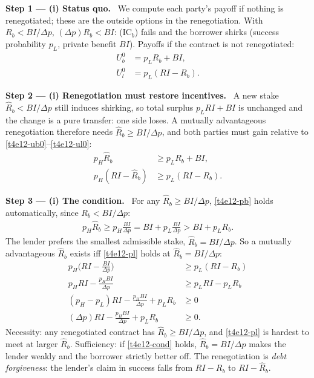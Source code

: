 \documentclass[11pt,a4paper]{article}
\newcommand{\step}[2]{\par\medskip\noindent\textbf{Step #1 --- #2.}~}
\begin{document}
\step{1}{(i) Status quo} We compute each party's payoff if nothing is renegotiated; these are the
outside options in the renegotiation. With $R_b<BI/\Delta p$, $(\Delta p)R_b<BI$: (IC$_b$) fails and
the borrower shirks (success probability $p_L$, private benefit $BI$). Payoffs if the contract is not
renegotiated:
\begin{align}
  U_b^0 &= p_LR_b+BI, \label{t4e12-ub0}\\
  U_l^0 &= p_L(RI-R_b). \label{t4e12-ul0}
\end{align}

\step{2}{(i) Renegotiation must restore incentives} A new stake $\hat R_b<BI/\Delta p$ still induces
shirking, so total surplus $p_LRI+BI$ is unchanged and the change is a pure transfer: one side loses.
A mutually advantageous renegotiation therefore needs $\hat R_b\ge BI/\Delta p$, and both parties must
gain relative to \eqref{t4e12-ub0}--\eqref{t4e12-ul0}:
\begin{align}
  p_H\hat R_b &\ge p_LR_b+BI, \label{t4e12-pb}\\
  p_H(RI-\hat R_b) &\ge p_L(RI-R_b). \label{t4e12-pl}
\end{align}

\step{3}{(i) The condition} For any $\hat R_b\ge BI/\Delta p$, \eqref{t4e12-pb} holds automatically, since
$R_b<BI/\Delta p$:
\begin{align}
  p_H\hat R_b \ge p_H\frac{BI}{\Delta p}=BI+p_L\frac{BI}{\Delta p} > BI+p_LR_b. \nonumber
\end{align}
The lender prefers the smallest admissible stake, $\hat R_b=BI/\Delta p$. So a mutually advantageous
$\hat R_b$ exists iff \eqref{t4e12-pl} holds at $\hat R_b=BI/\Delta p$:
\begin{align}
  p_H\Big(RI-\frac{BI}{\Delta p}\Big) &\ge p_L(RI-R_b) \nonumber\\
  p_HRI-\frac{p_HBI}{\Delta p} &\ge p_LRI-p_LR_b \nonumber\\
  (p_H-p_L)RI-\frac{p_HBI}{\Delta p}+p_LR_b &\ge 0 \nonumber\\
  (\Delta p)RI-\frac{p_HBI}{\Delta p}+p_LR_b &\ge 0. \label{t4e12-cond}
\end{align}
Necessity: any renegotiated contract has $\hat R_b\ge BI/\Delta p$, and \eqref{t4e12-pl} is hardest to
meet at larger $\hat R_b$. Sufficiency: if \eqref{t4e12-cond} holds, $\hat R_b=BI/\Delta p$ makes the
lender weakly and the borrower strictly better off. The renegotiation is \emph{debt forgiveness}: the
lender's claim in success falls from $RI-R_b$ to $RI-\hat R_b$.
\end{document}
